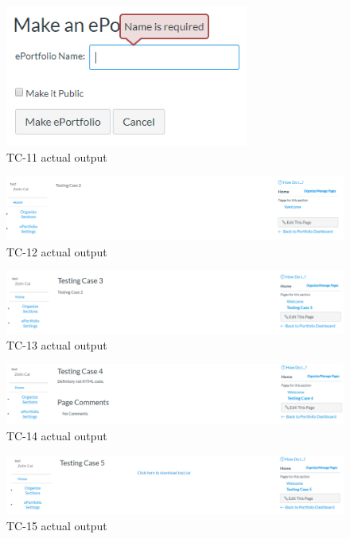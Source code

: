 \documentclass[10pt,letterpaper]{article}
\begin{document}
\newpage
\begin{figure}[h!]
	\centerline{\includegraphics[width=8cm]{screenshots/tc11-actual-output.png}}
	\caption{TC-11 actual output}
\end{figure}
\begin{figure}[h!]
	\centerline{\includegraphics[width=\textwidth]{screenshots/tc12-actual-output.png}}
	\caption{TC-12 actual output}
\end{figure}
\begin{figure}[h!]
	\centerline{\includegraphics[width=\textwidth]{screenshots/tc13-actual-output.png}}
	\caption{TC-13 actual output}
\end{figure}
\begin{figure}[h!]
	\centerline{\includegraphics[width=\textwidth]{screenshots/tc14-actual-output.png}}
	\caption{TC-14 actual output}
\end{figure}
\begin{figure}[h!]
	\centerline{\includegraphics[width=\textwidth]{screenshots/tc15-actual-output.png}}
	\caption{TC-15 actual output}
\end{figure}
\end{document}
